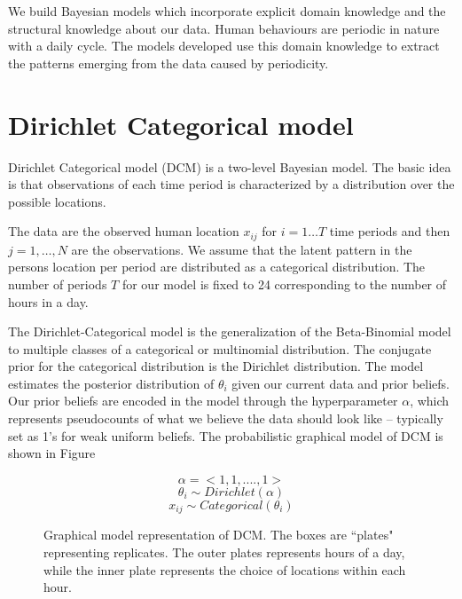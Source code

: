 We build Bayesian models which incorporate explicit domain knowledge and the structural knowledge about our data. Human behaviours are periodic in nature with a daily cycle. The models developed use this domain knowledge to extract the patterns emerging from the data caused by periodicity.

\section{Dirichlet Categorical model }

Dirichlet Categorical model (DCM) is a two-level Bayesian model. The basic idea is that observations of each time period is characterized by a distribution over the possible locations.

The data are the observed human location $x_{ij}$ for $i = 1 \dots T$ time periods and then $j = 1, \dots , N$  are the observations.  We assume that the latent pattern in the persons location per period are distributed as a categorical distribution. The number of periods $T$ for our model is fixed to 24 corresponding to the number of hours in a day. 

The Dirichlet-Categorical model is the generalization of the Beta-Binomial model to multiple classes of a categorical or multinomial distribution. The conjugate prior for the categorical distribution is the Dirichlet distribution. The model estimates the posterior distribution of $\theta_i$ given our current data and prior beliefs. Our prior beliefs are encoded in the model through the hyperparameter $\alpha$, which represents pseudocounts of what we believe the data should look like – typically set as 1's for weak uniform beliefs. The probabilistic graphical model of  DCM is shown in Figure \cite{dcm}

\noindent
\begin{figure}[htp]

\begin{minipage}{0.3\textwidth}
\centering


\end{minipage}%
\begin{minipage}{0.7\textwidth}

\begin{equation*}
	\alpha = <1, 1, .... , 1 > 
\end{equation*}
\begin{equation*}
	\theta_i  \sim Dirichlet(\alpha)
\end{equation*}
\begin{equation*}
	x_{ij} \sim Categorical(\theta_i)
\end{equation*}
\end{minipage}
\caption{Graphical model representation of DCM. The boxes are ``plates" representing replicates. The outer plates represents hours of a day, while the inner plate represents the choice of locations within each hour.}
\label{dcm}
\end{figure}

